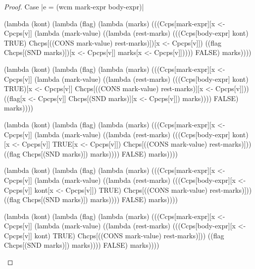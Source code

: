\begin{proof}{Case \scheme|e = (wcm mark-expr body-expr)|}
\begin{schemeblock}
\begin{schemedisplay}
(lambda (kont)
  (lambda (flag)
    (lambda (marks)
      (((Ccps[mark-expr][x <- Cpcps[v]]
          (lambda (mark-value) 
            ((lambda (rest-marks) 
               (((Ccps[body-expr] kont) TRUE) Chcps[((CONS mark-value) rest-marks)])[x <- Cpcps[v]])
             ((flag Chcps[(SND marks)])[x <- Cpcps[v]] marks[x <- Cpcps[v]]))))
        FALSE) marks))))
\end{schemedisplay}
\end{schemeblock}

\begin{schemeblock}
\begin{schemedisplay}
(lambda (kont)
  (lambda (flag)
    (lambda (marks)
      (((Ccps[mark-expr][x <- Cpcps[v]]
          (lambda (mark-value) 
            ((lambda (rest-marks) 
               (((Ccps[body-expr] kont) TRUE)[x <- Cpcps[v]] Chcps[((CONS mark-value) rest-marks)][x <- Cpcps[v]]))
             ((flag[x <- Cpcps[v]] Chcps[(SND marks)][x <- Cpcps[v]]) marks))))
        FALSE) marks))))
\end{schemedisplay}
\end{schemeblock}

\begin{schemeblock}
\begin{schemedisplay}
(lambda (kont)
  (lambda (flag)
    (lambda (marks)
      (((Ccps[mark-expr][x <- Cpcps[v]]
          (lambda (mark-value) 
            ((lambda (rest-marks) 
               (((Ccps[body-expr] kont)[x <- Cpcps[v]] TRUE[x <- Cpcps[v]]) Chcps[((CONS mark-value) rest-marks)]))
             ((flag Chcps[(SND marks)]) marks))))
        FALSE) marks))))
\end{schemedisplay}
\end{schemeblock}

\begin{schemeblock}
\begin{schemedisplay}
(lambda (kont)
  (lambda (flag)
    (lambda (marks)
      (((Ccps[mark-expr][x <- Cpcps[v]]
          (lambda (mark-value) 
            ((lambda (rest-marks) 
               (((Ccps[body-expr][x <- Cpcps[v]] kont[x <- Cpcps[v]]) TRUE) Chcps[((CONS mark-value) rest-marks)]))
             ((flag Chcps[(SND marks)]) marks))))
        FALSE) marks))))
\end{schemedisplay}
\end{schemeblock}

\begin{schemeblock}
\begin{schemedisplay}
(lambda (kont)
  (lambda (flag)
    (lambda (marks)
      (((Ccps[mark-expr][x <- Cpcps[v]]
          (lambda (mark-value) 
            ((lambda (rest-marks) 
               (((Ccps[body-expr][x <- Cpcps[v]] kont) TRUE) Chcps[((CONS mark-value) rest-marks)]))
             ((flag Chcps[(SND marks)]) marks))))
        FALSE) marks))))
\end{schemedisplay}
\end{schemeblock}


\end{proof}
